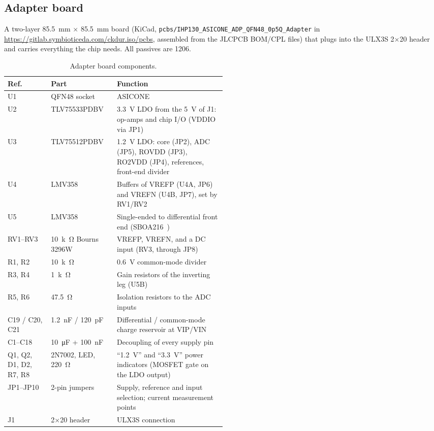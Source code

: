 \documentclass[10pt,a4paper]{article}
\begin{document}
\subsection{Adapter board}
\label{sec:board}
A two-layer \SI{85.5}{mm} $\times$ \SI{85.5}{mm} board (KiCad, \nolinkurl{pcbs/IHP130_ASICONE_ADP_QFN48_0p5Q_Adapter}
in \url{https://gitlab.symbioticeda.com/ckdur.iso/pcbs}, assembled from the JLCPCB BOM/CPL files) that plugs into the ULX3S 2$\times$20 header and carries
everything the chip needs. All passives are 1206.
\begin{table}[H]\centering\small
\begin{tabular}{llp{0.5\linewidth}}
\toprule
Ref. & Part & Function \\
\midrule
U1 & QFN48 socket & ASICONE \\
U2 & TLV75533PDBV & \SI{3.3}{V} LDO from the \SI{5}{V} of J1: op-amps and chip I/O (VDDIO via JP1) \\
U3 & TLV75512PDBV & \SI{1.2}{V} LDO: core (JP2), ADC (JP5), ROVDD (JP3), RO2VDD (JP4), references, front-end divider \\
U4 & LMV358 & Buffers of VREFP (U4A, JP6) and VREFN (U4B, JP7), set by RV1/RV2 \\
U5 & LMV358 & Single-ended to differential front end (SBOA216~\cite{sboa216}) \\
RV1--RV3 & \SI{10}{k\ohm} Bourns 3296W & VREFP, VREFN, and a DC input (RV3, through JP8) \\
R1, R2 & \SI{10}{k\ohm} & \SI{0.6}{V} common-mode divider \\
R3, R4 & \SI{1}{k\ohm} & Gain resistors of the inverting leg (U5B) \\
R5, R6 & \SI{47.5}{\ohm} & Isolation resistors to the ADC inputs \\
C19 / C20, C21 & \SI{1.2}{nF} / \SI{120}{pF} & Differential / common-mode charge reservoir at VIP/VIN \\
C1--C18 & \SI{10}{\micro F} + \SI{100}{nF} & Decoupling of every supply pin \\
Q1, Q2, D1, D2, R7, R8 & 2N7002, LED, \SI{220}{\ohm} & ``\SI{1.2}{V}'' and ``\SI{3.3}{V}'' power indicators (MOSFET gate on the LDO output) \\
JP1--JP10 & 2-pin jumpers & Supply, reference and input selection; current measurement points \\
J1 & 2$\times$20 header & ULX3S connection \\
\bottomrule
\end{tabular}
\caption{Adapter board components.}
\end{table}
\end{document}

